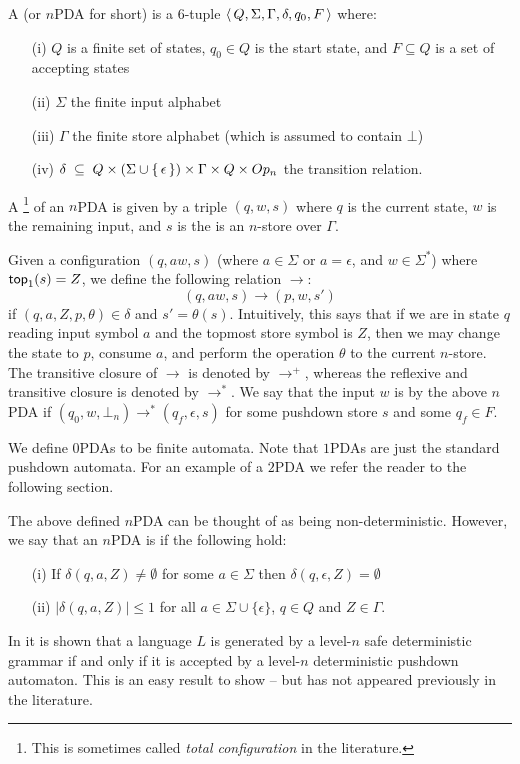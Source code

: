 \medskip

A  (or $n$PDA for short) is a
6-tuple $\langle\,{Q, \Sigma, \Gamma, \delta, q_0, F}\,\rangle$ where:
\begin{enumerate}
\item[(i)] $Q$ is a finite set of states, $q_0 \in Q$ is the start
state, and $F \subseteq Q$ is a set of accepting states
\item[(ii)] $\Sigma$ the finite input alphabet \item[(iii)]
$\Gamma$ the finite store alphabet (which is assumed to contain
$\bot$) \item[(iv)] $\delta \; \subseteq \; Q \times (\Sigma \cup
\{\,{\epsilon}\,\}) \times \Gamma \times Q \times Op_n$ the
transition relation.
\end{enumerate}
A \footnote{This is sometimes called
\emph{total configuration} in the literature.} of an $n$PDA is given
by a triple $(q, w, s)$ where $q$ is the current state, $w$ is the
remaining input, and $s$ is the is an $n$-store over $\Gamma$.

Given a configuration $(q, aw, s)$ (where $a \in \Sigma$ or $a =
\epsilon$, and $w \in \Sigma^*$) where ${\sf top}_1(s) = Z$, we
define the following relation ${\rightarrow}$:
\begin{equation}
\nonumber (q, aw, s) \rightarrow (p,w,s')
\end{equation}
if $(q,a,Z,p,\theta) \in \delta$ and $s' = \theta(s)$.
Intuitively, this says that if we are in state $q$ reading input
symbol $a$ and the topmost store symbol is $Z$, then we may change
the state to $p$, consume $a$, and perform the operation $\theta$
to the current $n$-store. The transitive closure of $\rightarrow$
is denoted by $\rightarrow^+$, whereas the reflexive and
transitive closure is denoted by $\rightarrow^*$. We say that the
input $w$ is  by the above $n$PDA if $(q_0, w,
\bot_n) \rightarrow^* (q_f, \epsilon, s)$ for some pushdown store
$s$ and some $q_f \in F$.

\begin{remark}\rm We define $0$PDAs to be finite automata. Note that $1$PDAs
are just the standard pushdown automata. For an example of a $2$PDA we
refer the reader to the following section.
\end{remark}

The above defined $n$PDA can be thought of as being
non-deterministic. However, we say that an $n$PDA is
 if the following hold:
\begin{enumerate}
\item[(i)] If $\delta(q,a,Z) \not = \emptyset$ for some $a \in \Sigma$ then
$\delta(q,\epsilon, Z) = \emptyset$
\item[(ii)] $|\delta(q,a,Z)| \leq 1$
for all $a \in \Sigma \cup \{\epsilon\}$, $q \in Q$ and $Z \in
\Gamma$.
\end{enumerate}

\begin{remark}
In \cite{dMO} it is shown that a language $L$ is generated by a
level-$n$ safe deterministic grammar if and only if it is accepted
by a level-$n$ deterministic pushdown automaton. This is an easy
result to show -- but has not appeared previously in the literature.
\end{remark}
